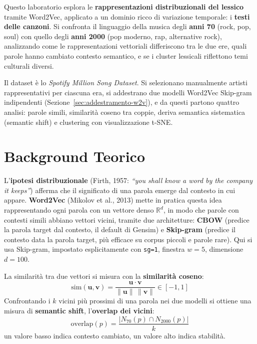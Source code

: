 \documentclass[12pt,a4paper]{article}
\begin{document}
Questo laboratorio esplora le \textbf{rappresentazioni distribuzionali del lessico} tramite Word2Vec, applicato a un dominio ricco di variazione temporale: i \textbf{testi delle canzoni}. Si confronta il linguaggio della musica degli \textbf{anni 70} (rock, pop, soul) con quello degli \textbf{anni 2000} (pop moderno, rap, alternative rock), analizzando come le rappresentazioni vettoriali differiscono tra le due ere, quali parole hanno cambiato contesto semantico, e se i cluster lessicali riflettono temi culturali diversi.

Il dataset è lo \textit{Spotify Million Song Dataset}. Si selezionano manualmente artisti rappresentativi per ciascuna era, si addestrano due modelli Word2Vec Skip-gram indipendenti (Sezione~\ref{sec:addestramento-w2v}), e da questi partono quattro analisi: parole simili, similarit\`a coseno tra coppie, deriva semantica sistematica (semantic shift) e clustering con visualizzazione t-SNE.

\section{Background Teorico}

L'\textbf{ipotesi distribuzionale} (Firth, 1957: \textit{``you shall know a word by the company it keeps''}) afferma che il significato di una parola emerge dal contesto in cui appare. \textbf{Word2Vec} (Mikolov et al., 2013) mette in pratica questa idea rappresentando ogni parola con un vettore denso $\mathbb{R}^d$, in modo che parole con contesti simili abbiano vettori vicini, tramite due architetture: \textbf{CBOW} (predice la parola target dal contesto, il default di Gensim) e \textbf{Skip-gram} (predice il contesto data la parola target, pi\`u efficace su corpus piccoli e parole rare). Qui si usa Skip-gram, impostato esplicitamente con \texttt{sg=1}, finestra $w=5$, dimensione $d=100$.

La similarit\`a tra due vettori si misura con la \textbf{similarit\`a coseno}:
\[
  \text{sim}(\mathbf{u},\mathbf{v}) = \frac{\mathbf{u}\cdot\mathbf{v}}{\|\mathbf{u}\|\,\|\mathbf{v}\|} \in [-1,1]
\]
Confrontando i $k$ vicini pi\`u prossimi di una parola nei due modelli si ottiene una misura di \textbf{semantic shift}, l'\textbf{overlap dei vicini}:
\[
  \text{overlap}(p) = \frac{|N_{70}(p)\cap N_{2000}(p)|}{k}
\]
un valore basso indica contesto cambiato, un valore alto indica stabilit\`a.
\end{document}
